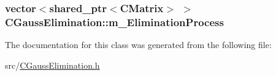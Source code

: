 \subsubsection[{\texorpdfstring{m\+\_\+\+Elimination\+Process}{m_EliminationProcess}}]{\setlength{\rightskip}{0pt plus 5cm}vector$<$shared\+\_\+ptr$<${\bf C\+Matrix}$>$ $>$ C\+Gauss\+Elimination\+::m\+\_\+\+Elimination\+Process\hspace{0.3cm}{\ttfamily [private]}}\hypertarget{classCGaussElimination_a82f7f27713bf7b300d6f858013cbe04b}{}\label{classCGaussElimination_a82f7f27713bf7b300d6f858013cbe04b}


The documentation for this class was generated from the following file\+:\begin{DoxyCompactItemize}
\item 
src/\hyperlink{CGaussElimination_8h}{C\+Gauss\+Elimination.\+h}\end{DoxyCompactItemize}
